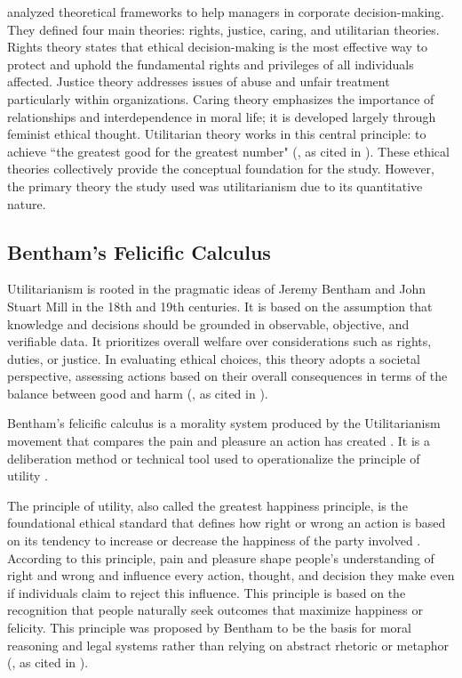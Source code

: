 \documentclass{icsthesis}
\begin{document}
\begin{mainmatter}
\citet{Pembi2024} analyzed theoretical frameworks to help managers in corporate decision-making. They defined four main theories: rights, justice, caring, and utilitarian theories. Rights theory states that ethical decision-making is the most effective way to protect and uphold the fundamental rights and privileges of all individuals affected.  Justice theory addresses issues of abuse and unfair treatment particularly within organizations. Caring theory emphasizes the importance of relationships and interdependence in moral life; it is developed largely through feminist ethical thought. Utilitarian theory works in this central principle: to achieve “the greatest good for the greatest number" (\citealt{WhiteTaft2004}, as cited in \citealt{Pembi2024}). These ethical theories collectively provide the conceptual foundation for the study. However, the primary theory the study used was utilitarianism due to its quantitative nature. 

\subsection{Bentham's Felicific Calculus}
Utilitarianism is rooted in the pragmatic ideas of Jeremy Bentham and John Stuart Mill in the 18th and 19th centuries. It is based on the assumption that knowledge and decisions should be grounded in observable, objective, and verifiable data. It prioritizes overall welfare over considerations such as rights, duties, or justice. In evaluating ethical choices, this theory adopts a societal perspective, assessing actions based on their overall consequences in terms of the balance between good and harm (\citealt{WhiteTaft2004}, as cited in \citealt{Pembi2024}).

Bentham's felicific calculus is a morality system produced by the Utilitarianism movement that compares the pain and pleasure an action has created \citep{Majot2014}. It is a deliberation method or technical tool used to operationalize the principle of utility \citep{Baujard2009}. 

The principle of utility, also called the greatest happiness principle, is the foundational ethical standard that defines how right or wrong an action is based on its tendency to increase or decrease the happiness of the party involved \citep{Bentham1907,Baujard2009}. According to this principle, pain and pleasure shape people's understanding of right and wrong and influence every action, thought, and decision they make even if individuals claim to reject this influence. This principle is based on the recognition that people naturally seek outcomes that maximize happiness or felicity. This principle was proposed by Bentham to be the basis for moral reasoning and legal systems rather than relying on abstract rhetoric or metaphor (\citealt{Bentham1789}, as cited in \citealt{Baujard2009}). 


\end{mainmatter}
\end{document}
